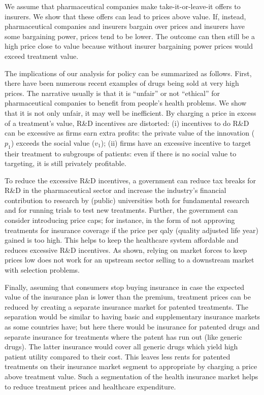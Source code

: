 \documentclass[a4paper,12pt]{article}
\begin{document}
We assume that pharmaceutical companies make take-it-or-leave-it offers to insurers. We show that these offers can lead to prices above value. If, instead, pharmaceutical companies and insurers bargain over prices and insurers have some bargaining power, prices tend to be lower. The outcome can then still be a high price close to value because without insurer bargaining power prices would exceed treatment value.

The implications of our analysis for policy can be summarized as follows. First, there have been numerous recent examples of drugs being sold at very high prices. The narrative usually is that it is ``unfair'' or not ``ethical'' for pharmaceutical companies to benefit from people's health problems. We show that it is not only unfair, it may well be inefficient. By charging a price in excess of a treatment's value, R\&D incentives are distorted: (i) incentives to do R\&D can be excessive as firms earn extra profits: the private value of the innovation (\(p_1\)) exceeds the social value (\(v_1\)); (ii) firms have an excessive incentive to target their treatment to subgroups of patients: even if there is no social value to targeting, it is still privately profitable.

To reduce the excessive R\&D incentives, a government can reduce tax breaks for R\&D in the pharmaceutical sector and increase the industry's financial contribution to research by (public) universities both for fundamental research and for running trials to test new treatments. Further, the government can consider introducing price caps; for instance, in the form of not approving treatments for insurance coverage if the price per qaly (quality adjusted life year) gained is too high. This helps to keep the healthcare system affordable and reduces excessive R\&D incentives. As shown, relying on market forces to keep prices low does not work for an upstream sector selling to a downstream market with selection problems.

Finally, assuming that consumers stop buying insurance in case the expected value of the insurance plan is lower than the premium, treatment prices can be reduced by creating a separate insurance market for patented treatments. The separation would be similar to having basic and supplementary insurance markets as some countries have; but here there would be insurance for patented drugs and separate insurance for treatments  where the patent has run out (like generic drugs). The latter insurance would cover all generic drugs which yield high patient utility compared to their cost. This leaves less rents for patented treatments on their insurance market segment to appropriate by charging a price above treatment value. Such a segmentation of the health insurance market helps to reduce treatment prices and healthcare expenditure.
\end{document}
